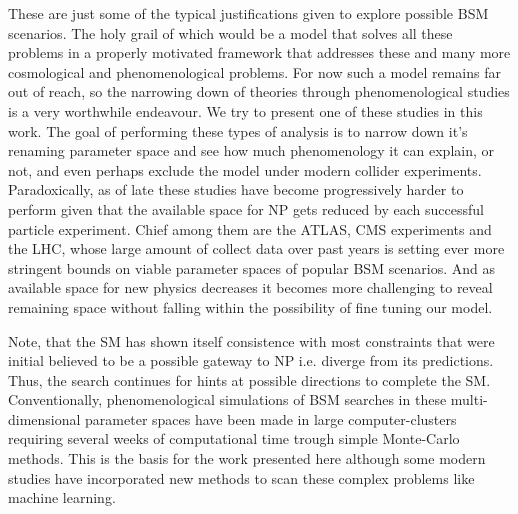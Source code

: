 These are just some of the typical justifications given to explore possible BSM scenarios. The holy grail of which would be a model that solves all these problems in a properly motivated framework that addresses these and many more cosmological and phenomenological problems.  
% 
For now such a model remains far out of reach, so the narrowing down of theories through phenomenological studies is a very worthwhile endeavour. We try to present one of these studies in this work. %
%
The goal of performing these types of analysis is to narrow down it's renaming parameter space and see how much phenomenology it can explain, or not, and even perhaps exclude the model under modern collider experiments.
%
Paradoxically, as of late these studies have become progressively harder to perform given that the available space for NP gets reduced by each successful particle experiment. 
%
Chief among them are the ATLAS, CMS experiments and the LHC, whose large amount of collect data over past years is setting ever more stringent bounds on viable parameter spaces of popular BSM scenarios. 
%
And as available space for new physics decreases it becomes more challenging to reveal remaining space without falling within the possibility of fine tuning our model.  


Note, that the SM has shown itself consistence with most constraints that were initial believed to be a possible gateway to NP i.e. diverge from its predictions. Thus, the search continues for hints at possible directions to complete the SM. %
%
Conventionally, phenomenological simulations of BSM searches in these multi-dimensional parameter spaces have been made in large computer-clusters requiring several weeks of computational time trough simple Monte-Carlo methods. 
%
This is the basis for the work presented here although some modern studies have incorporated new methods to scan these complex problems like machine learning. 
%


